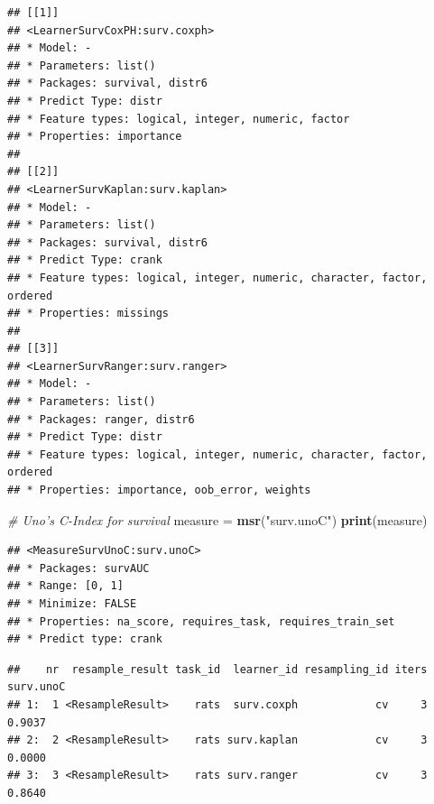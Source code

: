 \documentclass[]{scrbook}
\newenvironment{Shaded}{\begin{snugshade}}{\end{snugshade}}
\newcommand{\CommentTok}[1]{\textcolor[rgb]{0.56,0.35,0.01}{\textit{#1}}}
\newcommand{\DataTypeTok}[1]{\textcolor[rgb]{0.13,0.29,0.53}{#1}}
\newcommand{\DecValTok}[1]{\textcolor[rgb]{0.00,0.00,0.81}{#1}}
\newcommand{\KeywordTok}[1]{\textcolor[rgb]{0.13,0.29,0.53}{\textbf{#1}}}
\newcommand{\NormalTok}[1]{#1}
\newcommand{\OperatorTok}[1]{\textcolor[rgb]{0.81,0.36,0.00}{\textbf{#1}}}
\newcommand{\StringTok}[1]{\textcolor[rgb]{0.31,0.60,0.02}{#1}}
\renewenvironment{Shaded} {\begin{snugshade}\small} {\end{snugshade}}
\begin{document}
\begin{verbatim}
## [[1]]
## <LearnerSurvCoxPH:surv.coxph>
## * Model: -
## * Parameters: list()
## * Packages: survival, distr6
## * Predict Type: distr
## * Feature types: logical, integer, numeric, factor
## * Properties: importance
## 
## [[2]]
## <LearnerSurvKaplan:surv.kaplan>
## * Model: -
## * Parameters: list()
## * Packages: survival, distr6
## * Predict Type: crank
## * Feature types: logical, integer, numeric, character, factor, ordered
## * Properties: missings
## 
## [[3]]
## <LearnerSurvRanger:surv.ranger>
## * Model: -
## * Parameters: list()
## * Packages: ranger, distr6
## * Predict Type: distr
## * Feature types: logical, integer, numeric, character, factor, ordered
## * Properties: importance, oob_error, weights
\end{verbatim}

\begin{Shaded}
\begin{Highlighting}[]
\CommentTok{# Uno's C-Index for survival}
\NormalTok{measure =}\StringTok{ }\KeywordTok{msr}\NormalTok{(}\StringTok{"surv.unoC"}\NormalTok{)}
\KeywordTok{print}\NormalTok{(measure)}
\end{Highlighting}
\end{Shaded}

\begin{verbatim}
## <MeasureSurvUnoC:surv.unoC>
## * Packages: survAUC
## * Range: [0, 1]
## * Minimize: FALSE
## * Properties: na_score, requires_task, requires_train_set
## * Predict type: crank
\end{verbatim}

\begin{Shaded}
\end{Shaded}

\begin{verbatim}
##    nr  resample_result task_id  learner_id resampling_id iters surv.unoC
## 1:  1 <ResampleResult>    rats  surv.coxph            cv     3    0.9037
## 2:  2 <ResampleResult>    rats surv.kaplan            cv     3    0.0000
## 3:  3 <ResampleResult>    rats surv.ranger            cv     3    0.8640
\end{verbatim}
\end{document}
